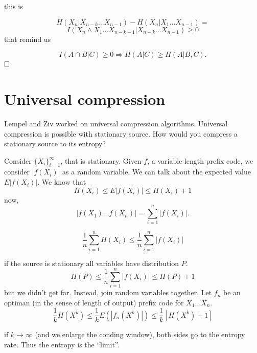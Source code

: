 this is

\[
 H(X_n | X_{n-k} \ldots X_{n-1}) -H(X_n|X_1\ldots X_{n-1}) =
\]
\[
 I(X_n \wedge X_1 \ldots X_{n-k-1} | X_{n-k} \ldots X_{n-1}) \geq 0
\]
that remind us

\[
 I(A \cap B | C) \geq 0 \Rightarrow H(A|C) \geq H(A | B,C).
\]
$ \hfill\Box$

\section{Universal compression}
Lempel and Ziv worked on universal compression algorithms. Universal compression is possible with stationary source. How would you compress a stationary source to its entropy?

Consider $\{X_i\}_{i=1}^\infty$, that is stationary. Given $f$, a variable length prefix code, we consider $|f(X_i)|$ as a random variable. We can talk about the expected value $E|f(X_i)|$. We know that
\[
 H(X_i) \leq E|f(X_i)| \leq H(X_i) + 1
\]
now,
\[
|f(X_1)\ldots f(X_n)| = \sum_{i=1}^n|f(X_i)|. 
\]

\[
 \dfrac{1}{n}\sum_{i=1}^n H(X_i) \leq\dfrac{1}{n}\sum_{i=1}^n |f(X_i)|
\]

if the source is stationary all variables have distribution $P$.
\[
 H(P) \leq \dfrac{1}{n} \sum_{i = 1}^n |f(X_i)| \leq H(P) + 1
\]
but we didn't get far. Instead, join random variables together. Let $f_n$ be an optiman (in the sense of length of output) prefix code for $X_1 \ldots X_n$.
\[
 \dfrac{1}{k}H(X^k) \leq \dfrac{1}{k}E(|f_n(X^k)|) \leq \dfrac{1}{k}[H(X^k) + 1]
\]

if $k \rightarrow \infty$ (and we enlarge the conding window), both sides go to the entropy rate. Thus the entropy is the ``limit''.
